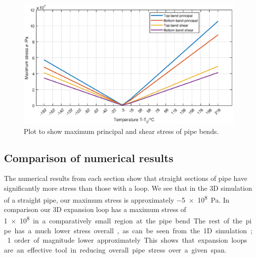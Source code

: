 \begin{figure}[H]
    \centering
    \includegraphics[width = \textwidth]{img/part2cii.eps}
    \caption{Plot to show maximum principal and shear stress of pipe bends.}
    \label{part2c2}
\end{figure}
\subsection{Comparison of numerical results}
The numerical results from each section show that straight sections of pipe have significantly more stress than those with a loop. We see that in the 3D simulation of a straight pipe, our maximum stress is approximately \SI{-5e8}{\pascal}. In comparison our 3D expansion loop has a maximum stress of \SI{1e8} in a comparatively small region at the pipe bend. The rest of the pipe has a much lower stress overall, as can be seen from the 1D simulation; 1 order of magnitude lower approximately. This shows that expansion loops are an effective tool in reducing overall pipe stress over a given span.

